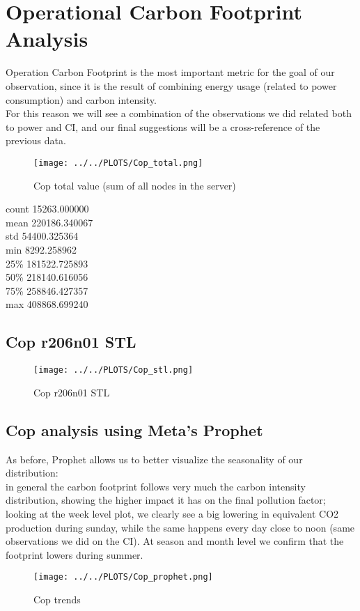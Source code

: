 \section{Operational Carbon Footprint Analysis}
Operation Carbon Footprint is the most important metric for the goal of our observation, since it is the result of combining energy usage (related to power consumption) and carbon intensity. \\
For this reason we will see a combination of the observations we did related both to power and CI, and our final suggestions will be a cross-reference of the previous data.

\vspace{-15pt}

\begin{figure}[H]
\centering
\texttt{[image: ../../PLOTS/Cop\_total.png]}
\captionsetup{skip=-10pt}
\caption{Cop total value (sum of all nodes in the server)}
\label{fig:Cop_total}
\end{figure}

\begin{center}
count     15263.000000 \\
mean     220186.340067 \\
std       54400.325364 \\
min        8292.258962 \\
25\%      181522.725893 \\
50\%      218140.616056 \\
75\%      258846.427357 \\
max      408868.699240   
\end{center}

\subsection{Cop r206n01 STL}

\vspace{-10pt}

\begin{figure}[H]
\centering
\texttt{[image: ../../PLOTS/Cop\_stl.png]}
\caption{Cop r206n01 STL}
\label{fig:Cop_r206n01_stl}
\end{figure}

\subsection{Cop analysis using Meta's Prophet}
As before, Prophet allows us to better visualize the seasonality of our distribution: \\
in general the carbon footprint follows very much the carbon intensity distribution, showing the higher impact it has on the final pollution factor;
looking at the week level plot, we clearly see a big lowering in equivalent CO2 production during sunday, while the same happens every day close to noon (same observations we did on the CI). 
At season and month level we confirm that the footprint lowers during summer.

\vspace{-10pt}

\begin{figure}[H]
\centering
\texttt{[image: ../../PLOTS/Cop\_prophet.png]}
\caption{Cop trends}
\label{fig:Cop_prophet}
\end{figure}